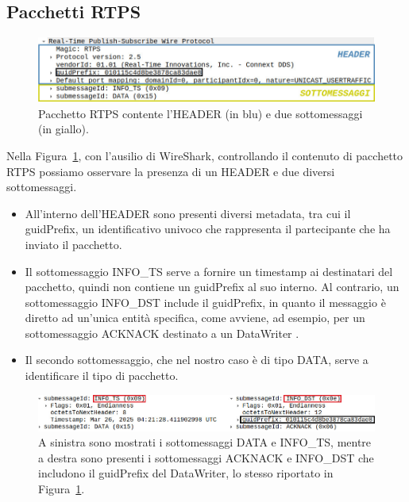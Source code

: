 \subsection{Pacchetti RTPS}


\begin{figure}[H]
    \centering
    \includegraphics[width=15.2cm, keepaspectratio]{img/Header e sottomessaggi esempio shapes2.jpg}
    \caption{Pacchetto RTPS contente l'HEADER (in blu) e due sottomessaggi (in giallo).}
    \label{headersubmessagedemo}
\end{figure}



Nella Figura~\ref{headersubmessagedemo}, con l'ausilio di WireShark,
controllando il contenuto di pacchetto RTPS possiamo osservare la presenza
di un HEADER e due diversi sottomessaggi. 
\begin{itemize}
    \item All'interno dell'HEADER sono presenti
    diversi metadata, tra cui il guidPrefix, un identificativo univoco che rappresenta
    il partecipante che ha inviato il pacchetto.
    \item Il sottomessaggio INFO\_TS serve a fornire un timestamp ai destinatari 
    del pacchetto,
    quindi non contiene un guidPrefix al 
    suo interno. Al contrario, un sottomessaggio INFO\_DST include
    il guidPrefix, in quanto il messaggio è diretto ad un'unica
    entità specifica, come avviene, ad esempio, per un sottomessaggio ACKNACK
    destinato a un DataWriter \cite{rtiwireshark}.
    \item Il secondo sottomessaggio, che nel nostro caso è di tipo DATA,
    serve a identificare il tipo di pacchetto.
\end{itemize}
\begin{figure}[H]
    \centering
    \includegraphics[width=15.2cm, keepaspectratio]{img/Info_ts e info_DST-Pagina-3.jpg}
    \caption{A sinistra sono mostrati i sottomessaggi DATA e INFO\_TS, 
    mentre a destra sono presenti i sottomessaggi ACKNACK e INFO\_DST che
    includono 
    il guidPrefix del DataWriter, lo stesso riportato in 
    Figura~\ref{headersubmessagedemo}.}
    \label{Info_ts e info_DST}
\end{figure}


